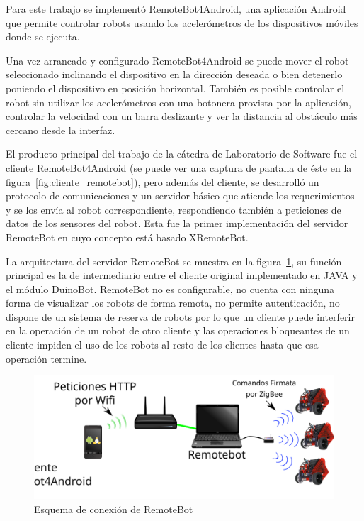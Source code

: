 Para este trabajo se implementó RemoteBot4Android,
una aplicación Android
que permite controlar robots usando los acelerómetros de los dispositivos
móviles donde se ejecuta.

Una vez arrancado y configurado RemoteBot4Android se puede mover el robot
seleccionado inclinando el dispositivo en la dirección deseada o bien
detenerlo poniendo el dispositivo en posición horizontal. También es
posible controlar el robot sin utilizar los acelerómetros
con una botonera provista por la aplicación,
controlar la velocidad con un barra deslizante y ver la distancia al obstáculo
más cercano desde la interfaz.

El producto principal del trabajo de la cátedra de Laboratorio de
Software fue el cliente
RemoteBot4Android (se puede ver una captura de pantalla de éste
en la figura~\ref{fig:cliente_remotebot}),
pero además del cliente, se desarrolló un
protocolo de comunicaciones
y un servidor básico que atiende los requerimientos y se los envía al
robot correspondiente, respondiendo también a peticiones de datos de
los sensores del
robot. Esta fue la primer implementación del servidor
RemoteBot
en cuyo concepto está basado XRemoteBot.

La arquitectura del servidor RemoteBot se muestra en la
figura~\ref{fig:arquitectura_remotebot}, su función principal es la
de intermediario entre el cliente original implementado en JAVA
 y el módulo DuinoBot.
RemoteBot no es configurable, no cuenta con ninguna forma de visualizar
los robots de forma remota, no permite autenticación, no dispone de un
sistema de reserva de robots por lo que un cliente puede interferir en la
operación de un robot de otro cliente y las operaciones bloqueantes de un
cliente impiden el uso de los robots al resto de los clientes hasta que esa
operación termine.

\begin{figure}
    \centering
    \includegraphics[width=\textwidth]{figures/arquitectura_remotebot}
    \caption{Esquema de conexión de RemoteBot}\label{fig:arquitectura_remotebot}
\end{figure}


